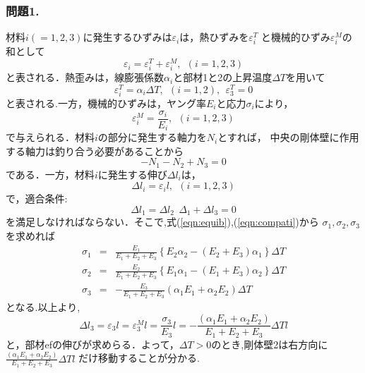 ﻿\documentclass[10pt,a4j]{jarticle}
\begin{document}
\subsubsection*{問題1.}
材料$i(=1,2,3)$に発生するひずみは$\varepsilon_i$は，熱ひずみを$\varepsilon_i^T$
と機械的ひずみ$\varepsilon_i^M$の和として
\begin{equation}
	\varepsilon_i =
	\varepsilon_i^T 
	+
	\varepsilon_i^M, \ \ (i=1,2,3) 
\end{equation}
と表される．熱歪みは，線膨張係数$\alpha_i$と部材1と2の上昇温度$\Delta T$を用いて
\begin{equation}
	\varepsilon_i^T= \alpha_i \Delta T, \ \ (i=1,2), \ \ 
	\varepsilon_3^T=0
\end{equation}
と表される.一方，機械的ひずみは，ヤング率$E_i$と応力$\sigma_i$により，
\begin{equation}
	\varepsilon_i^M= \frac{\sigma_i}{E_i}, \ \ (i=1,2,3)
\end{equation}
で与えられる．材料$i$の部分に発生する軸力を$N_i$とすれば，
中央の剛体壁に作用する軸力は釣り合う必要があることから
\begin{equation}
	-N_1-N_2+N_3=0 
	\label{eqn:equib}
\end{equation}
である．一方，材料$i$に発生する伸び$\Delta l_i$は，
\begin{equation}
	\Delta l_i = \varepsilon_i l, \ \ (i=1,2,3) 
\end{equation}
で，適合条件:
\begin{equation}
	\Delta l_1=\Delta l_2 \ \ \Delta_1+\Delta l_3=0
	\label{eqn:compati}
\end{equation}
を満足しなければならない．そこで,式(\ref{eqn:equib}),(\ref{eqn:compati})から
$\sigma_1, \sigma_2, \sigma_3$を求めれば
\begin{eqnarray}
	\sigma_1 &=& 
	\frac{E_1}{E_1+E_2+E_3} \left\{E_2\alpha_2-(E_2+E_3)\alpha_1\right\}\Delta T
	\\
	\sigma_2 &=& 
	\frac{E_2}{E_1+E_2+E_3} \left\{E_1\alpha_1-(E_1+E_3)\alpha_2\right\}\Delta T
	\\
	\sigma_3 &=& 
	-\frac{E_3}{E_1+E_2+E_3} \left( \alpha_1 E_1+\alpha_2E_2\right)\Delta T
\end{eqnarray}
となる.以上より,
\begin{equation}
	\Delta l_3= \varepsilon_3 l = \varepsilon^M_3 l = \frac{\sigma_3}{E_3}l
	=
	-\frac{
		( \alpha_1 E_1+\alpha_2E_2)
	}{E_1+E_2+E_3}\Delta Tl
\end{equation}
と，部材efの伸びが求めらる．よって，$\Delta T>0$のとき,剛体壁2は右方向に
$\frac{( \alpha_1 E_1+\alpha_2E_2)}{E_1+E_2+E_3} \Delta Tl$
だけ移動することが分かる.
\end{document}
